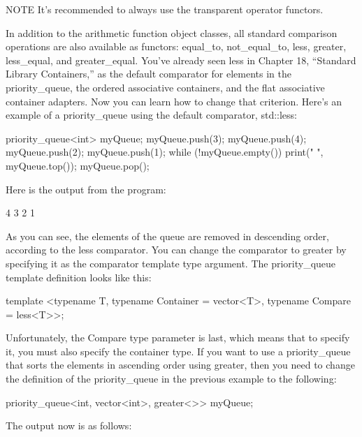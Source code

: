 \begin{myNotic}{NOTE}
It’s recommended to always use the transparent operator functors.
\end{myNotic}


In addition to the arithmetic function object classes, all standard comparison operations are also available as functors: equal\_to, not\_equal\_to, less, greater, less\_equal, and greater\_equal. You’ve already seen less in Chapter 18, “Standard Library Containers,” as the default comparator for elements in the priority\_queue, the ordered associative containers, and the flat associative container adapters. Now you can learn how to change that criterion. Here’s an example of a priority\_queue using the default comparator, std::less:

\begin{cpp}
priority_queue<int> myQueue;
myQueue.push(3);
myQueue.push(4);
myQueue.push(2);
myQueue.push(1);
while (!myQueue.empty()) {
    print("{} ", myQueue.top());
    myQueue.pop();
}
\end{cpp}

Here is the output from the program:

\begin{shell}
4 3 2 1
\end{shell}

As you can see, the elements of the queue are removed in descending order, according to the less comparator. You can change the comparator to greater by specifying it as the comparator template type argument. The priority\_queue template definition looks like this:

\begin{cpp}
template <typename T, typename Container = vector<T>, typename Compare = less<T>>;
\end{cpp}

Unfortunately, the Compare type parameter is last, which means that to specify it, you must also specify the container type. If you want to use a priority\_queue that sorts the elements in ascending order using greater, then you need to change the definition of the priority\_queue in the previous example to the following:

\begin{cpp}
priority_queue<int, vector<int>, greater<>> myQueue;
\end{cpp}

The output now is as follows:

